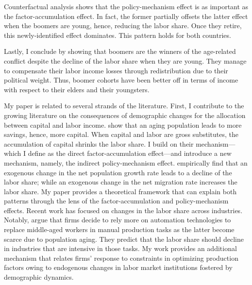 Counterfactual analysis shows that the policy-mechanism effect is as important as the factor-accumulation effect. In fact, the former partially offsets the latter effect when the boomers are young, hence, reducing the labor share. Once they retire, this newly-identified effect dominates. This pattern holds for both countries.

Lastly, I conclude by showing that boomers are the winners of the age-related conflict despite the decline of the labor share when they are young. They manage to compensate their labor income losses through redistribution due to their political weight. Thus, boomer cohorts have been better off in terms of income with respect to their elders and their youngsters.

My paper is related to several strands of the literature. First, I contribute to the growing literature on the consequences of demographic changes for the allocation between capital and labor income. 
\citet{Schmidt2013Demographic} show that an aging population leads to more savings, hence, more capital. When capital and labor are gross
substitutes, the accumulation of capital shrinks the labor share. 
I build on their mechanism--- which I define as the direct factor-accumulation effect---and introduce a new mechanism, namely, the indirect policy-mechanism effect. %
\citet{Albis2021Demographic} empirically find that an exogenous change in the net population growth rate leads to a decline of the labor share; while an exogenous change in the net migration rate increases the labor share.
My paper provides a theoretical framework that can explain both patterns through the lens of the factor-accumulation and policy-mechanism effects.
Recent work has focused on changes in the labor share across industries. Notably, \citet{Acemoglu2022Demographics} argue that firms decide to rely more on automation technologies to replace middle-aged workers in manual production tasks as the latter become scarce due to population aging. They predict that the labor share should decline in industries that are intensive in those tasks.
My work provides an additional mechanism that relates firms' response to constraints in optimizing production factors owing to endogenous changes in labor market institutions fostered by demographic dynamics.

